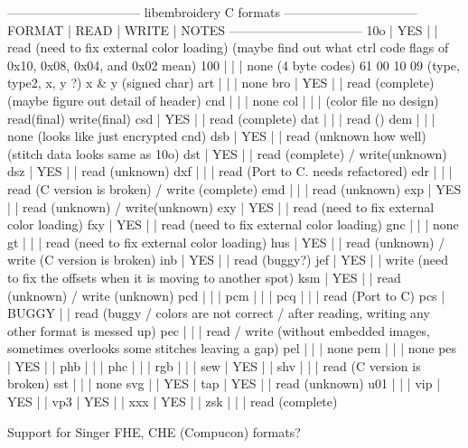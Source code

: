 --------------------------------
libembroidery C formats
--------------------------------
FORMAT | READ  | WRITE | NOTES
--------------------------------
10o    | YES   |       | read (need to fix external color loading) (maybe find out what ctrl code flags of 0x10, 0x08, 0x04, and 0x02 mean)
100    |       |       | none (4 byte codes) 61 00 10 09 (type, type2, x, y ?) x & y (signed char)
art    |       |       | none
bro    | YES   |       | read (complete)(maybe figure out detail of header)
cnd    |       |       | none
col    |       |       | (color file no design) read(final) write(final)
csd    | YES   |       | read (complete)
dat    |       |       | read ()
dem    |       |       | none (looks like just encrypted cnd)
dsb    | YES   |       | read (unknown how well) (stitch data looks same as 10o)
dst    | YES   |       | read (complete) / write(unknown)
dsz    | YES   |       | read (unknown)
dxf    |       |       | read (Port to C. needs refactored)
edr    |       |       | read (C version is broken) / write (complete)
emd    |       |       | read (unknown)
exp    | YES   |       | read (unknown) / write(unknown)
exy    | YES   |       | read (need to fix external color loading)
fxy    | YES   |       | read (need to fix external color loading)
gnc    |       |       | none
gt     |       |       | read (need to fix external color loading)
hus    | YES   |       | read (unknown) / write (C version is broken)
inb    | YES   |       | read (buggy?)
jef    | YES   |       | write (need to fix the offsets when it is moving to another spot)
ksm    | YES   |       | read (unknown) / write (unknown)
pcd    |       |       | 
pcm    |       |       | 
pcq    |       |       | read (Port to C)
pcs    | BUGGY |       | read (buggy / colors are not correct / after reading, writing any other format is messed up)
pec    |       |       | read / write (without embedded images, sometimes overlooks some stitches leaving a gap)
pel    |       |       | none
pem    |       |       | none
pes    | YES   |       | 
phb    |       |       | 
phc    |       |       | 
rgb    |       |       | 
sew    | YES   |       | 
shv    |       |       | read (C version is broken)
sst    |       |       | none
svg    |       | YES   | 
tap    | YES   |       | read (unknown)
u01    |       |       | 
vip    | YES   |       | 
vp3    | YES   |       | 
xxx    | YES   |       | 
zsk    |       |       | read (complete)


Support for Singer FHE, CHE (Compucon) formats?



